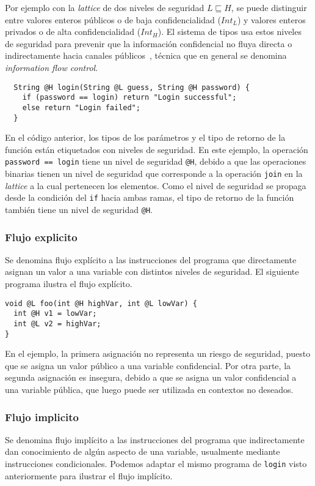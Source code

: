   	Por ejemplo con la \textit{lattice} de dos niveles de seguridad $L \sqsubseteq H$, se puede distinguir entre valores enteros públicos o de baja confidencialidad ($Int_L$) y valores enteros privados o de alta confidencialidad ($Int_H$). El sistema de tipos usa estos niveles de seguridad para prevenir que la información confidencial no fluya directa o indirectamente hacia canales públicos~\cite{volpanoAl:S96}, técnica que en general se denomina \textit{information flow control}.

  	\begin{lstlisting}
  String @H login(String @L guess, String @H password) {
  	if (password == login) return "Login successful";
  	else return "Login failed";
  }
  	\end{lstlisting}

    En el código anterior, los tipos de los parámetros y el tipo de retorno de la función están etiquetados con niveles de seguridad. En este ejemplo, la operación \texttt{password == login} tiene un nivel de seguridad \texttt{@H}, debido a que las operaciones binarias tienen un nivel de seguridad que corresponde a la operación \texttt{join} en la \textit{lattice} a la cual pertenecen los elementos. Como el nivel de seguridad se propaga desde la condición del \texttt{if} hacia ambas ramas, el tipo de retorno de la función también tiene un nivel de seguridad \texttt{@H}.

\subsubsection{Flujo explicito}
Se denomina flujo explícito a las instrucciones del programa que directamente asignan un valor a una variable con distintos niveles de seguridad. El siguiente programa ilustra el flujo explícito.

\begin{lstlisting}
void @L foo(int @H highVar, int @L lowVar) {
  int @H v1 = lowVar;
  int @L v2 = highVar;
}
\end{lstlisting}

En el ejemplo, la primera asignación no representa un riesgo de seguridad, puesto que se asigna un valor público a una variable confidencial. Por otra parte, la segunda asignación es insegura, debido a que se asigna un valor confidencial a una variable pública, que luego puede ser utilizada en contextos no deseados.

\subsubsection{Flujo implicito}
Se denomina flujo implícito a las instrucciones del programa que indirectamente dan conocimiento de algún aspecto de una variable, usualmente mediante instrucciones condicionales. Podemos adaptar el mismo programa de \texttt{login} visto anteriormente para ilustrar el flujo implícito.

